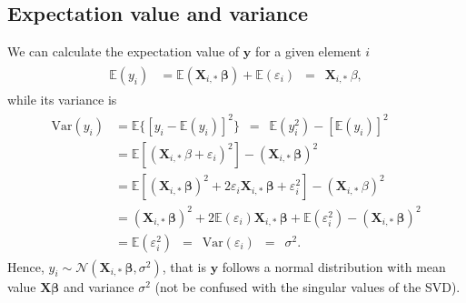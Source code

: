 \documentclass[letterpaper,10pt,english]{sphinxmanual}
\begin{document}
\subsection{Expectation value and variance}
\label{\detokenize{chapter4:expectation-value-and-variance}}
We can calculate the expectation value of \(\boldsymbol{y}\) for a given element \(i\)
\begin{equation*}
\begin{split}
\begin{align*} 
\mathbb{E}(y_i) & =
\mathbb{E}(\mathbf{X}_{i, \ast} \, \boldsymbol{\beta}) + \mathbb{E}(\varepsilon_i)
\, \, \, = \, \, \, \mathbf{X}_{i, \ast} \, \beta, 
\end{align*}
\end{split}
\end{equation*}
while
its variance is
\begin{equation*}
\begin{split}
\begin{align*} \mbox{Var}(y_i) & = \mathbb{E} \{ [y_i
- \mathbb{E}(y_i)]^2 \} \, \, \, = \, \, \, \mathbb{E} ( y_i^2 ) -
[\mathbb{E}(y_i)]^2  \\  & = \mathbb{E} [ ( \mathbf{X}_{i, \ast} \,
\beta + \varepsilon_i )^2] - ( \mathbf{X}_{i, \ast} \, \boldsymbol{\beta})^2 \\ &
= \mathbb{E} [ ( \mathbf{X}_{i, \ast} \, \boldsymbol{\beta})^2 + 2 \varepsilon_i
\mathbf{X}_{i, \ast} \, \boldsymbol{\beta} + \varepsilon_i^2 ] - ( \mathbf{X}_{i,
\ast} \, \beta)^2 \\  & = ( \mathbf{X}_{i, \ast} \, \boldsymbol{\beta})^2 + 2
\mathbb{E}(\varepsilon_i) \mathbf{X}_{i, \ast} \, \boldsymbol{\beta} +
\mathbb{E}(\varepsilon_i^2 ) - ( \mathbf{X}_{i, \ast} \, \boldsymbol{\beta})^2 
\\ & = \mathbb{E}(\varepsilon_i^2 ) \, \, \, = \, \, \,
\mbox{Var}(\varepsilon_i) \, \, \, = \, \, \, \sigma^2.  
\end{align*}
\end{split}
\end{equation*}
Hence, \(y_i \sim \mathcal{N}( \mathbf{X}_{i, \ast} \, \boldsymbol{\beta}, \sigma^2)\), that is \(\boldsymbol{y}\) follows a normal distribution with
mean value \(\boldsymbol{X}\boldsymbol{\beta}\) and variance \(\sigma^2\) (not be confused with the singular values of the SVD).
\end{document}
